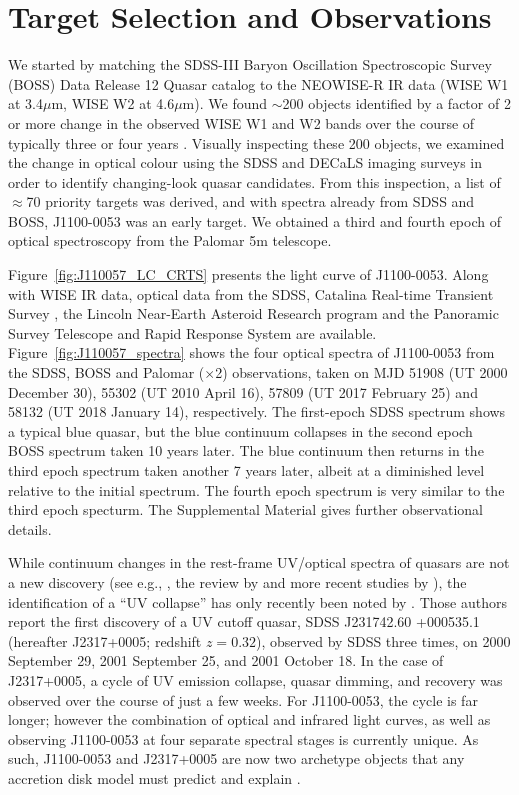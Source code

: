 \documentclass{nature}
\begin{document}
\section{Target Selection and Observations}  
We started by matching the SDSS-III Baryon Oscillation Spectroscopic
Survey (BOSS) Data Release 12 Quasar catalog \cite[DR12Q;
][]{Paris2017} to the NEOWISE-R IR data (WISE W1 at 3.4$\mu$m, WISE W2
at 4.6$\mu$m). We found $\sim$200 objects identified by a factor of 2
or more change in the observed WISE W1 and W2 bands over the course of
typically three or four years \citep[see][and the Supplemental
Material for the detailed NEOWISE-R selection]{Meisner2017b}. Visually
inspecting these 200 objects, we examined the change in optical colour
using the SDSS and DECaLS imaging surveys in order to identify
changing-look quasar candidates.  From this inspection, a list of
$\approx$70 priority targets was derived, and with spectra already
from SDSS and BOSS, J1100-0053 was an early target. We obtained a
third and fourth epoch of optical spectroscopy from the Palomar 5m
telescope.

Figure~\ref{fig:J110057_LC_CRTS} presents the light curve of
J1100-0053.  Along with WISE IR data, optical data from the SDSS,
Catalina Real-time Transient Survey \citep[CRTS;][]{Drake2009,
Mahabal2011}, the Lincoln Near-Earth Asteroid Research \citep[LINEAR;
][]{Sesar2011} program and the Panoramic Survey Telescope and Rapid
Response System \citep[PanSTARRS;][]{Kaiser2010, Stubbs2010,
Tonry2012, Magnier2013} are
available. Figure~\ref{fig:J110057_spectra} shows the four optical
spectra of J1100-0053 from the SDSS, BOSS and Palomar ($\times$2)
observations, taken on MJD 51908 (UT 2000 December 30), 55302 (UT 2010
April 16), 57809 (UT 2017 February 25) and 58132 (UT 2018 January 14),
respectively.  The first-epoch SDSS spectrum shows a typical blue
quasar, but the blue continuum collapses in the second epoch BOSS
spectrum taken 10 years later. The blue continuum then returns in the
third epoch spectrum taken another 7 years later, albeit at a
diminished level relative to the initial spectrum. The fourth epoch
spectrum is very similar to the third epoch specturm.  The
Supplemental Material gives further observational details.

While continuum changes in the rest-frame UV/optical spectra of
quasars are not a new discovery (see e.g., \cite{Clavel1991}, the
review by \cite{Ulrich1997} and more recent studies by
\cite{VandenBerk2004, Pereyra2006, MacLeod2010, Guo2016b}), the
identification of a ``UV collapse'' has only recently been noted by
\cite{Guo2016}.  Those authors report the first discovery of a UV
cutoff quasar, SDSS J231742.60 +000535.1 (hereafter J2317+0005;
redshift $z = 0.32$), observed by SDSS three times, on 2000
September 29, 2001 September 25, and 2001 October 18. In
the case of J2317+0005, a cycle of UV emission collapse,
quasar dimming, and recovery was observed over the
course of just a few weeks. For J1100-0053, the cycle is far longer;
however the combination of
optical and infrared light curves, as well as observing J1100-0053 at
four separate spectral stages is currently unique. As such,
J1100-0053 and J2317+0005 are now two archetype objects that any
accretion disk model must predict and explain \cite{Lawrence2018}.
\end{document}
